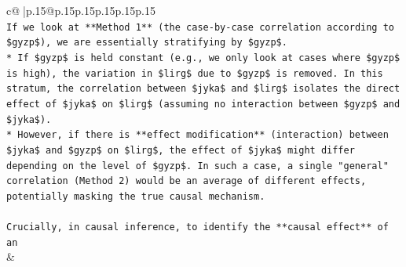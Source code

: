 \documentclass{article}
\begin{document}
{\begin{supertabular}{c@{$\;$}|p{.15\linewidth}@{}p{.15\linewidth}p{.15\linewidth}p{.15\linewidth}p{.15\linewidth}p{.15\linewidth}}
{{{\\ 
\texttt{If we look at **Method 1** (the case{-}by{-}case correlation according to \$gyzp\$), we are essentially stratifying by \$gyzp\$.} \\
\texttt{*   If \$gyzp\$ is held constant (e.g., we only look at cases where \$gyzp\$ is high), the variation in \$lirg\$ due to \$gyzp\$ is removed. In this stratum, the correlation between \$jyka\$ and \$lirg\$ isolates the direct effect of \$jyka\$ on \$lirg\$ (assuming no interaction between \$gyzp\$ and \$jyka\$).} \\
\texttt{*   However, if there is **effect modification** (interaction) between \$jyka\$ and \$gyzp\$ on \$lirg\$, the effect of \$jyka\$ might differ depending on the level of \$gyzp\$. In such a case, a single "general" correlation (Method 2) would be an average of different effects, potentially masking the true causal mechanism.} \\
\\ 
\texttt{Crucially, in causal inference, to identify the **causal effect** of an} \\
            }
        }
    }
    & \\ \\


\end{supertabular}}
\end{document}
